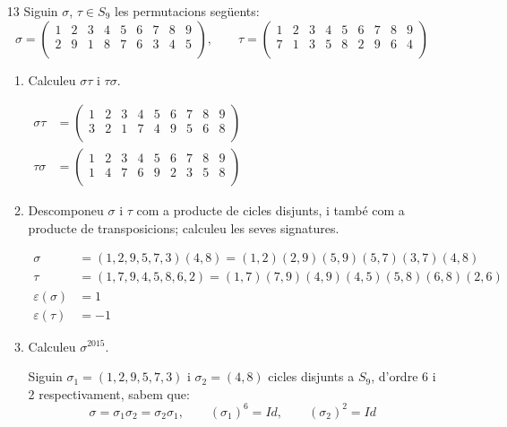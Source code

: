 \documentclass[a4paper, 11pt]{article}
\begin{document}
\begin{enumerate}
	\item[13] Siguin $\sigma$, $\tau \in S_9$ les permutacions següents:
		\[\sigma = \begin{pmatrix}
			1 & 2 & 3 & 4 & 5 & 6 & 7 & 8 & 9 \\
			2 & 9 & 1 & 8 & 7 & 6 & 3 & 4 & 5 \\
		\end{pmatrix},\qquad \tau = \begin{pmatrix}
			1 & 2 & 3 & 4 & 5 & 6 & 7 & 8 & 9 \\
			7 & 1 & 3 & 5 & 8 & 2 & 9 & 6 & 4 \\
		\end{pmatrix}\]

		\begin{enumerate}
			\item Calculeu $\sigma \tau$ i $\tau \sigma$. \medskip
			
				$\begin{aligned} \sigma \tau &= \begin{pmatrix}
						1 & 2 & 3 & 4 & 5 & 6 & 7 & 8 & 9 \\
						3 & 2 & 1 & 7 & 4 & 9 & 5 & 6 & 8 \\
					\end{pmatrix} \\
					\tau \sigma &= \begin{pmatrix}
						1 & 2 & 3 & 4 & 5 & 6 & 7 & 8 & 9 \\
						1 & 4 & 7 & 6 & 9 & 2 & 3 & 5 & 8 \\
				\end{pmatrix} \end{aligned}$\medskip

			\item Descomponeu $\sigma$ i $\tau$ com a producte de cicles disjunts, i també com a producte de transposicions; calculeu les seves signatures. \medskip
			
			$\displaystyle\begin{aligned}
				\sigma & = (1,2,9,5,7,3)(4,8) = (1,2)(2,9)(5,9)(5,7)(3,7)(4,8) \\
				\tau & = (1,7,9,4,5,8,6,2) = (1,7)(7,9)(4,9)(4,5)(5,8)(6,8)(2,6) \\
				\varepsilon (\sigma) & = 1 \\
				\varepsilon (\tau) & = -1
			\end{aligned}$\medskip

			\item Calculeu $\sigma^{2015}$.
				
				Siguin $\sigma_1 = (1,2,9,5,7,3)$ i $\sigma_2 = (4,8)$ cicles disjunts a $S_9$, d'ordre 6 i 2 respectivament, sabem que: 
				\[\sigma = \sigma_1 \sigma_2 = \sigma_2 \sigma_1,\qquad
				(\sigma_1)^6 = Id,\qquad
				(\sigma_2)^2 = Id\]
				

\end{enumerate}
\end{enumerate}
\end{document}
